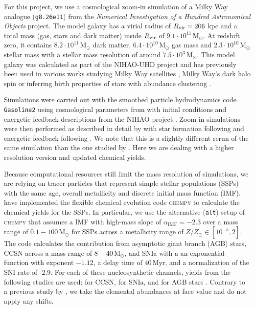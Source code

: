 \documentclass[fleqn,usenatbib]{mnras}
\begin{document}
For this project, we use a cosmological zoom-in simulation of a Milky Way analogue (\texttt{g8.26e11}) from the \textit{Numerical Investigation of a Hundred Astronomical Objects} \citep[NIHAO,][]{Wang2015} project. The model galaxy has a virial radius of $R_{\rm vir}=206$ kpc and a total mass (gas, stars and dark matter) inside $R_{\rm vir}$ of $9.1 \cdot 10^{11}\,\mathrm{M_\odot}$. At redshift zero, it contains $8.2 \cdot 10^{11}\,\mathrm{M_\odot}$ dark matter, $6.4 \cdot 10^{10}\,\mathrm{M_\odot}$ gas mass and $2.3 \cdot 10^{10}\,\mathrm{M_\odot}$ stellar mass with a stellar mass resolution of around $7.5 \cdot 10^{3}\,\mathrm{M_\odot}$. This model galaxy was calculated as part of the NIHAO-UHD project \citep{Buck2020b} and has previously been used in various works studying Milky Way satellites \citep{Buck2019b}, Milky Way's dark halo spin \citep{Obreja2022} or inferring birth properties of stars with abundance clustering \citep{Ratcliffe2022}.

Simulations were carried out with the smoothed particle hydrodynamics code \texttt{Gasoline2} \citep{Wadsley2017} using cosmological parameters from \citet{Planck2014} with initial conditions and energetic feedback descriptions from the NIHAO project \citep{Wang2015}. Zoom-in simulations were then performed as described in detail by \citet{Buck2021} with star formation following \citet{Stinson2006} and energetic feedback following \citet{Stinson2013}. We note that this is a slightly different rerun of the same simulation than the one studied by \citet{Buder2024}. Here we are dealing with a higher resolution version and updated chemical yields.

Because computational resources still limit the mass resolution of simulations, we are relying on tracer particles that represent simple stellar populations (SSPs) with the same age, overall metallicity and discrete initial mass function (IMF). \citet{Buck2021} have implemented the flexible chemical evolution code \textsc{chempy} \citep{Rybizki2017} to calculate the chemical yields for the SSPs. In particular, we use the alternative (\texttt{alt}) setup of \textsc{chempy} that assumes a \citet{Chabrier2003} IMF with high-mass slope of $\alpha_\text{IMF} = -2.3$ over a mass range of $0.1-100\,\mathrm{M_\odot}$ for SSPs across a metallicity range of $Z/Z_\odot \in [10^{-5},2]$. The code calculates the contribution from asymptotic giant branch (AGB) stars, CCSN across a mass range of $8-40\,\mathrm{M_\odot}$, and SNIa with a an exponential function with exponent $-1.12$, a delay time of $40\,\mathrm{Myr}$, and a normalization of the SNI rate of -2.9. For each of these nucleosynthetic channels, yields from the following studies are used: \citet{Chieffi2004} for CCSN, \citet{Seitenzahl2013} for SNIa, and \citet{Karakas2016} for AGB stars \citep[\texttt{new\_fit} model in][]{Buck2021}. Contrary to a previous study by \citet{Buder2024}, we take the elemental abundances at face value and do not apply any shifts.
\end{document}
